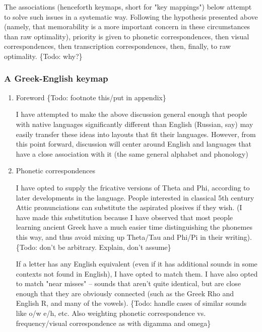 \documentclass[11pt]{article}
\begin{document}
The associations (henceforth keymaps, short for "key mappings") below attempt to solve such issues in a systematic way. Following the hypothesis presented above (namely, that memorability is a more important concern in these circumstances than raw optimality), priority is given to phonetic correspondences, then visual correspondences, then transcription correspondences, then, finally, to raw optimality. \{Todo: why?\}

\subsubsection{A Greek-English keymap}
\label{sec:org2690a76}

\begin{enumerate}
\item Foreword \{Todo: footnote this/put in appendix\}
\label{sec:org651d70c}

I have attempted to make the above discussion general enough that people with native languages significantly different than English (Russian, say) may easily transfer these ideas into layouts that fit their languages. However, from this point forward, discussion will center around English and languages that have a close association with it (the same general alphabet and phonology)

\item Phonetic correspondences
\label{sec:org982db9e}

I have opted to supply the fricative versions of Theta and Phi, according to later developments in the language. People interested in classical 5th century Attic pronunciations can substitute the aspirated plosives if they wish. (I have made this substitution because I have observed that most people learning ancient Greek have a much easier time distinguishing the phonemes this way, and thus avoid mixing up Theta/Tau and Phi/Pi in their writing). \{Todo: don't be arbitrary. Explain, don't assume\}

If a letter has any English equivalent (even if it has additional sounds in some contexts not found in English), I have opted to match them. I have also opted to match "near misses" -- sounds that aren't quite identical, but are close enough that they are obviously connected (such as the Greek Rho and English R, and many of the vowels). \{Todo: handle cases of similar sounds like o/w e/h, etc. Also weighting phonetic correspondence vs. frequency/visual correspondence as with digamma and omega\}


\end{enumerate}
\end{document}
